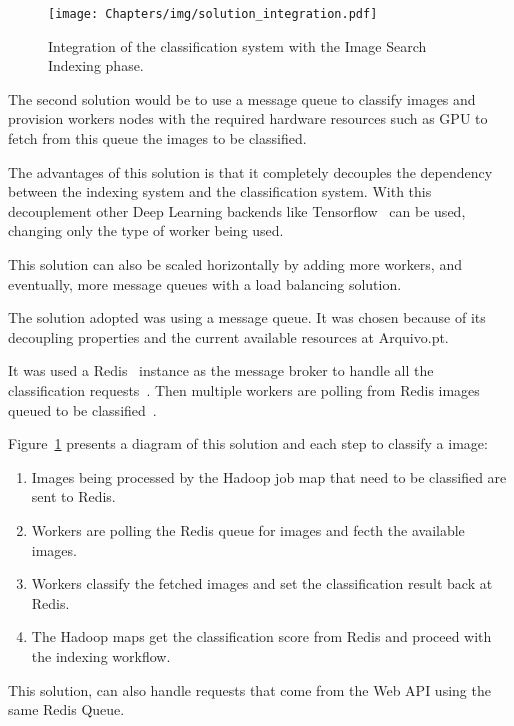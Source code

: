 \begin{figure}[H]
    \centering
    \texttt{[image: Chapters/img/solution\_integration.pdf]}
    \caption{Integration of the classification system with the Image Search Indexing phase.}
    \label{fig:solution_integration}
\end{figure}

The second solution would be to use a message queue to classify images and provision workers nodes with the required hardware resources such as GPU to fetch from this queue the images to be classified.

The advantages of this solution is that it completely decouples the dependency between the indexing system and the classification system. With this decouplement other Deep Learning backends like Tensorflow~\cite{DBLP:journals/corr/AbadiABBCCCDDDG16} can be used, changing only the type of worker being used.

This solution can also be scaled horizontally by adding more workers, and eventually, more message queues with a load balancing solution. 

The solution adopted was using a message queue. It was chosen because of its decoupling properties and the current available resources at Arquivo.pt. 

It was used a Redis~\cite{redis} instance as the message broker to handle all the classification requests~\cite{indeximages}. Then multiple workers are polling from Redis images queued to be classified~\cite{safeimages}.

Figure~\ref{fig:solution_integration} presents a diagram of this solution and each step to classify a image:

\begin{enumerate}
\item Images being processed by the Hadoop job map that need to be classified are sent to Redis.
\item Workers are polling the Redis queue for images and fecth the available images.
\item Workers classify the fetched images and set the classification result back at Redis.
\item The Hadoop maps get the classification score from Redis and proceed with the indexing workflow.
\end{enumerate}

This solution, can also handle requests that come from the Web API using the same Redis Queue.


